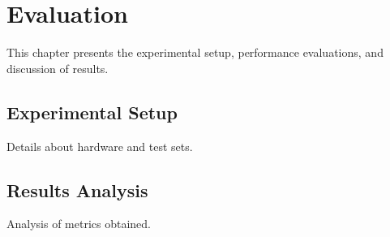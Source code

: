 \chapter{Evaluation}

This chapter presents the experimental setup, performance evaluations, and discussion of results.

\section{Experimental Setup}
Details about hardware and test sets.

\section{Results Analysis}
Analysis of metrics obtained.
